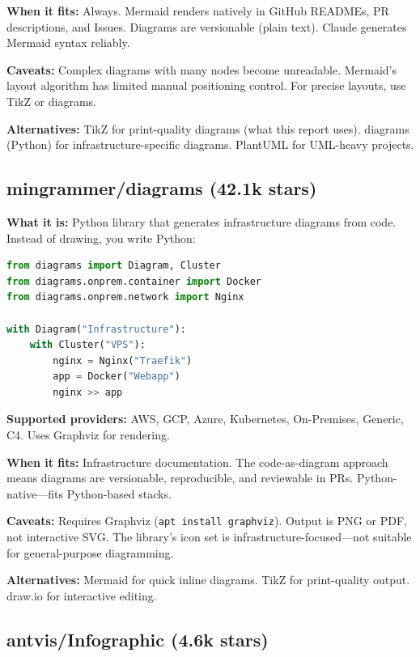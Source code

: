 \documentclass[11pt,a4paper]{article}
\begin{document}
\textbf{When it fits:} Always. Mermaid renders natively in GitHub READMEs, PR descriptions, and Issues. Diagrams are versionable (plain text). Claude generates Mermaid syntax reliably.

\textbf{Caveats:} Complex diagrams with many nodes become unreadable. Mermaid's layout algorithm has limited manual positioning control. For precise layouts, use TikZ or diagrams.

\textbf{Alternatives:} TikZ for print-quality diagrams (what this report uses). diagrams (Python) for infrastructure-specific diagrams. PlantUML for UML-heavy projects.

\subsection{mingrammer/diagrams (42.1k stars)}

\textbf{What it is:} Python library that generates infrastructure diagrams from code. Instead of drawing, you write Python:

\begin{lstlisting}[language=Python]
from diagrams import Diagram, Cluster
from diagrams.onprem.container import Docker
from diagrams.onprem.network import Nginx

with Diagram("Infrastructure"):
    with Cluster("VPS"):
        nginx = Nginx("Traefik")
        app = Docker("Webapp")
        nginx >> app
\end{lstlisting}

\textbf{Supported providers:} AWS, GCP, Azure, Kubernetes, On-Premises, Generic, C4. Uses Graphviz for rendering.

\textbf{When it fits:} Infrastructure documentation. The code-as-diagram approach means diagrams are versionable, reproducible, and reviewable in PRs. Python-native---fits Python-based stacks.

\textbf{Caveats:} Requires Graphviz (\texttt{apt install graphviz}). Output is PNG or PDF, not interactive SVG. The library's icon set is infrastructure-focused---not suitable for general-purpose diagramming.

\textbf{Alternatives:} Mermaid for quick inline diagrams. TikZ for print-quality output. draw.io for interactive editing.

\subsection{antvis/Infographic (4.6k stars)}
\end{document}
